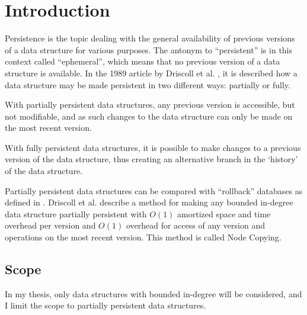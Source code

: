 \chapter{Introduction}
Persistence is the topic dealing with the general availability of previous
versions of a data structure for various purposes. The antonym to ``persistent''
is in this context called ``ephemeral'', which means that no previous version of
a data structure is available. In the 1989 article by Driscoll et al.
\cite{Driscoll198986}, it is described how a data structure may be made
persistent in two different ways: partially or fully.

With partially persistent data structures, any previous version is accessible,
but not modifiable, and as such changes to the data structure can only be made
on the most recent version.

With fully persistent data structures, it is possible to make changes to a
previous version of the data structure, thus creating an alternative branch in
the `history' of the data structure.

Partially persistent data structures can be compared with ``rollback'' databases
as defined in \cite{10.1109/AFIPS.1987.11}. Driscoll et al. describe a method
for making any bounded in-degree data structure partially persistent with $O(1)$
amortized space and time overhead per version and $O(1)$ overhead for access of
any version and operations on the most recent version. This method is called
Node Copying.

\section{Scope}

In my thesis, only data structures with bounded in-degree will be considered,
and I limit the scope to partially persistent data structures.

